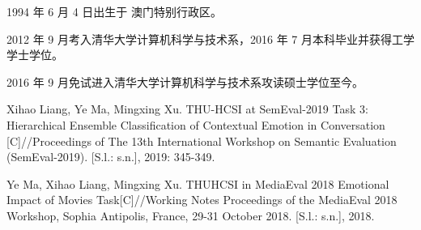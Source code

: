 \begin{resume}


  1994 年 6 月 4 日出生于 澳门特别行政区。

  2012 年 9 月考入清华大学计算机科学与技术系，2016 年 7 月本科毕业并获得工学学士学位。

  2016 年 9 月免试进入清华大学计算机科学与技术系攻读硕士学位至今。



  \begin{publications}[before=\publicationskip,after=\publicationskip]

    \item Xihao Liang, Ye Ma, Mingxing Xu. THU-HCSI at SemEval-2019 Task 3: Hierarchical Ensemble Classification of Contextual Emotion in Conversation [C]//Proceedings of The 13th International Workshop on Semantic Evaluation (SemEval-2019). [S.l.: s.n.], 2019: 345-349.

    \item Ye Ma, Xihao Liang, Mingxing Xu. THUHCSI in MediaEval 2018 Emotional Impact of Movies Task[C]//Working Notes Proceedings of the MediaEval 2018 Workshop, Sophia Antipolis, France, 29-31 October 2018. [S.l.: s.n.], 2018.

  \end{publications}


\end{resume}

